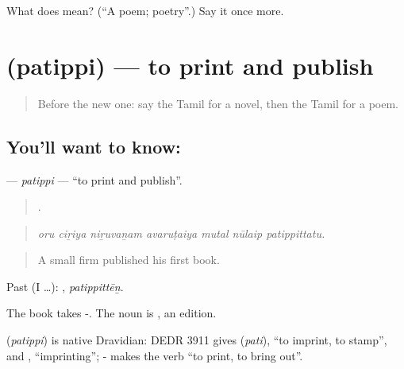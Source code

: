 \begin{tcolorbox}[breakable,colback=teal!4,colframe=teal!35!black,title={Before you move on}]
What does  mean? (\textquotedblleft{}A poem; poetry\textquotedblright{}.) Say it once more.
\end{tcolorbox}
\section[\texorpdfstring{\ta{பதிப்பி} (patippi)}{பதிப்பி (patippi)}]{ (patippi) — to print and publish}

\label{lesson:TA-C528-patippi}



\begin{quote}
Before the new one: say the Tamil for a novel, then the Tamil for a poem.
\end{quote}

\subsection*{You'll want to know: }
\textbf{} — \emph{patippi} — \textquotedblleft{}to print and publish\textquotedblright{}.

\begin{quote}
      .
\end{quote}

\begin{quote}
\emph{oru ciṟiya niṟuvaṉam avaruṭaiya mutal nūlaip patippittatu.}
\end{quote}

\begin{quote}
A small firm published his first book.
\end{quote}

Past (I …): , \emph{patippittēṉ}.

The book takes -. The noun is , an edition.

\begin{cousinweb}
\textbf{} (\emph{patippi}) is native Dravidian: DEDR 3911 gives  (\emph{pati}), \textquotedblleft{}to imprint, to stamp\textquotedblright{}, and , \textquotedblleft{}imprinting\textquotedblright{}; - makes the verb \textquotedblleft{}to print, to bring out\textquotedblright{}.
\end{cousinweb}


